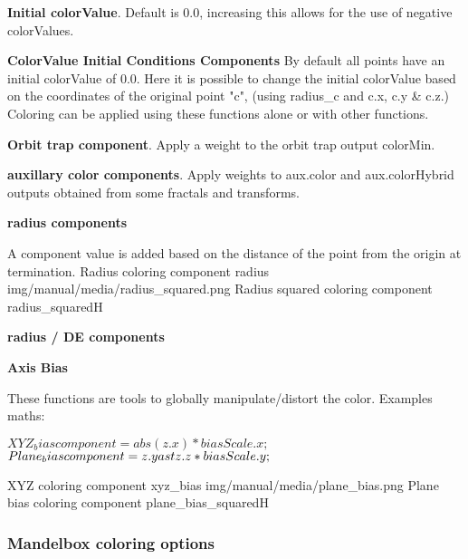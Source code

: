 \textbf{Initial colorValue}. Default is 0.0, increasing this allows for the use of negative colorValues.

\textbf{ColorValue Initial Conditions Components}
By default all points have an initial colorValue of 0.0. Here it is possible to change the initial colorValue  based on the coordinates of the original point "c", (using radius\_c and c.x, c.y \& c.z.) Coloring can be applied using these functions alone or with other functions.

\textbf{Orbit trap component}. Apply a weight to the orbit trap output colorMin.

\textbf{auxillary color components}. Apply weights to aux.color and aux.colorHybrid outputs obtained from some fractals and transforms.

\textbf{radius components} 

A component value is added based on the distance of the point from the origin at termination.
{Radius coloring component}
{radius}
{img/manual/media/radius_squared.png}
{Radius squared coloring component}
{radius_squared}{H}

\textbf{radius / DE components}

\textbf{Axis Bias}

These functions are tools to globally manipulate/distort the color. 
Examples maths:

$XYZ_bias                component = abs(z.x) \ast biasScale.x;$
$Plane_bias              component = z.y \\ast z.z \ast biasScale.y;$

{XYZ coloring component}
{xyz_bias}
{img/manual/media/plane_bias.png}
{Plane bias coloring component}
{plane_bias_squared}{H}



\subsubsection{Mandelbox coloring options}\label{materials-mandelbox}






